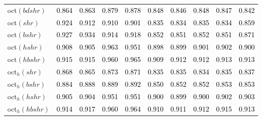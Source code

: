 \begin{tabular}[t]{>{\centering\arraybackslash}m{2.5cm}ccccccccc}
oct$(bdshr)$ & \textcolor{black}{0.864} & \textcolor{black}{0.863} & \textcolor{black}{0.879} & \textcolor{black}{0.878} & \textcolor{black}{0.848} & \textcolor{black}{0.846} & \textcolor{black}{0.848} & \textcolor{black}{0.847} & \textcolor{black}{0.842}\\
oct$(shr)$ & \textcolor{black}{0.924} & \textcolor{black}{0.912} & \textcolor{black}{0.910} & \textcolor{black}{0.901} & \textcolor{black}{0.835} & \textcolor{black}{0.834} & \textcolor{black}{0.835} & \textcolor{black}{0.834} & \textcolor{black}{0.859}\\
oct$(bshr)$ & \textcolor{black}{0.927} & \textcolor{black}{0.934} & \textcolor{black}{0.914} & \textcolor{black}{0.918} & \textcolor{black}{0.852} & \textcolor{black}{0.851} & \textcolor{black}{0.852} & \textcolor{black}{0.851} & \textcolor{black}{0.871}\\
oct$(hshr)$ & \textcolor{black}{0.908} & \textcolor{black}{0.905} & \textcolor{black}{0.963} & \textcolor{black}{0.951} & \textcolor{black}{0.898} & \textcolor{black}{0.899} & \textcolor{black}{0.901} & \textcolor{black}{0.902} & \textcolor{black}{0.900}\\
oct$(hbshr)$ & \textcolor{black}{0.915} & \textcolor{black}{0.915} & \textcolor{black}{0.960} & \textcolor{black}{0.965} & \textcolor{black}{0.909} & \textcolor{black}{0.912} & \textcolor{black}{0.912} & \textcolor{black}{0.913} & \textcolor{black}{0.913}\\
oct$_h(shr)$ & \textcolor{black}{0.868} & \textcolor{black}{0.865} & \textcolor{black}{0.873} & \textcolor{black}{0.871} & \textcolor{black}{0.835} & \textcolor{black}{0.835} & \textcolor{black}{0.834} & \textcolor{black}{0.835} & \textcolor{black}{0.837}\\
oct$_h(bshr)$ & \textcolor{black}{0.884} & \textcolor{black}{0.888} & \textcolor{black}{0.889} & \textcolor{black}{0.892} & \textcolor{black}{0.850} & \textcolor{black}{0.852} & \textcolor{black}{0.852} & \textcolor{black}{0.853} & \textcolor{black}{0.853}\\
oct$_h(hshr)$ & \textcolor{black}{0.905} & \textcolor{black}{0.904} & \textcolor{black}{0.951} & \textcolor{black}{0.951} & \textcolor{black}{0.900} & \textcolor{black}{0.899} & \textcolor{black}{0.900} & \textcolor{black}{0.902} & \textcolor{black}{0.903}\\
oct$_h(hbshr)$ & \textcolor{black}{0.914} & \textcolor{black}{0.917} & \textcolor{black}{0.960} & \textcolor{black}{0.964} & \textcolor{black}{0.910} & \textcolor{black}{0.911} & \textcolor{black}{0.912} & \textcolor{black}{0.915} & \textcolor{black}{0.913}\\
\bottomrule
\end{tabular}
